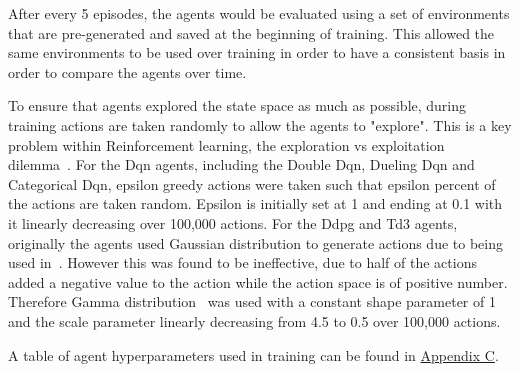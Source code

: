 After every 5 episodes, the agents would be evaluated using a set of environments that are pre-generated and
saved at the beginning of training. This allowed the same environments to be used over training in order to have a
consistent basis in order to compare the agents over time.

To ensure that agents explored the state space as much as possible, during training actions are taken randomly to allow
the agents to "explore". This is a key problem within Reinforcement learning, the exploration vs exploitation
dilemma~\citep{Sutton1998}. For the Dqn agents, including the Double Dqn, Dueling Dqn and Categorical Dqn,
epsilon greedy actions were taken such that epsilon percent of the actions are taken random. Epsilon is initially set
at 1 and ending at 0.1 with it linearly decreasing over 100,000 actions. For the Ddpg and Td3 agents, originally
the agents used Gaussian distribution to generate actions due to being used in~\cite{ddpg}. However this was found to be
ineffective, due to half of the actions added a negative value to the action while the action space is of positive number.
Therefore Gamma distribution~\citep{gamma-distribution} was used with a constant shape parameter of 1 and the scale
parameter linearly decreasing from 4.5 to 0.5 over 100,000 actions.

A table of agent hyperparameters used in training can be found in \hyperref[app:agent-hyperparameter]{Appendix C}.

